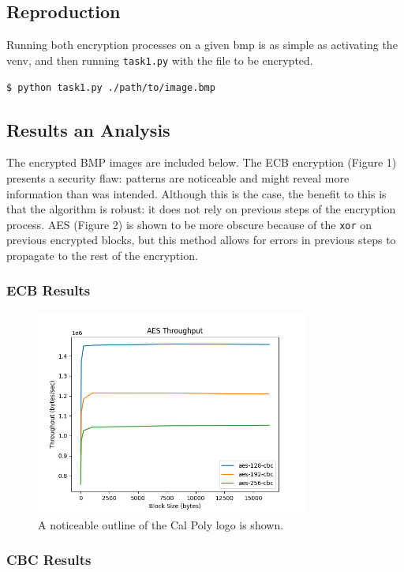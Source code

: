 \documentclass[11pt]{article}
\begin{document}
\subsection*{Reproduction}

Running both encryption processes on a given bmp is as simple as activating the venv, and then running \verb|task1.py| with the file to be encrypted.

\verb|$ python task1.py ./path/to/image.bmp|

\subsection*{Results an Analysis}

The encrypted BMP images are included below. The ECB encryption (Figure 1) presents a security flaw: patterns are noticeable and might reveal more information than was intended. Although this is the case, the benefit to this is that the algorithm is robust: it does not rely on previous steps of the encryption process. AES (Figure 2) is shown to be more obscure because of the \verb|xor| on previous encrypted blocks, but this method allows for errors in previous steps to propagate to the rest of the encryption.

\subsubsection*{ECB Results}

\begin{figure}
	\centering
	\includegraphics[width=0.8\textwidth]{./plts/aes.png}
	\caption{A noticeable outline of the Cal Poly logo is shown.}
	\label{fig.1: ECB Encryption}
\end{figure}

\subsubsection*{CBC Results}
\end{document}
